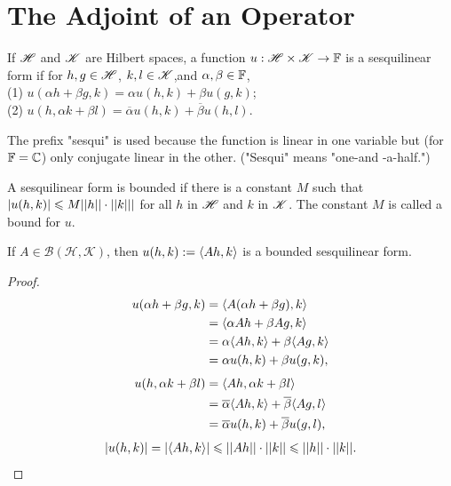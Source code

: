 \chapter{The Adjoint of an Operator}\label{chp:2_2}

\begin{definition}{}{}
    If $\mathscr{H}$ and $\mathscr{K}$ are Hilbert spaces, a function $u:\mathscr{H}\times\mathscr{K}\rightarrow \mathbb{F}$ is a sesquilinear form if for 
    $h,g\in\mathscr{H}$, $k,l\in \mathscr{K}$,and $\alpha,\beta\in\mathbb{F}$,\\
    (1) $u(\alpha h+\beta g,k)=\alpha u(h,k)+\beta u(g,k)$;\\
    (2) $u(h,\alpha k+\beta l)=\overline{\alpha}u(h,k)+\overline{\beta}u(h,l)$.
\end{definition}

The prefix "sesqui" is used because the function is linear in one variable 
but (for $\mathbb{F} = \mathbb{C}$) only conjugate linear in the other. ("Sesqui" means 
"one-and -a-half.")

A sesquilinear form is bounded if there is a constant $M$ such that 
$|u(h,k)|\leqslant M||h||\cdot ||k|||$ for all $h$ in $\mathscr{H}$ and $k$ in $\mathscr{K}$. 
The constant $M$ is called a bound for $u$.


\begin{proposition}
    If $A \in \mathcal{B}(\mathscr{H},\mathscr{K})$, 
then $u(h, k):=  \langle Ah,k\rangle$ is a bounded sesquilinear form.
\end{proposition}

\begin{proof}{}{}
    \begin{align*}
        u(\alpha h+\beta g,k) &=  \langle A(\alpha h+\beta g),k\rangle\\
                            &= \langle\alpha Ah+\beta Ag,k\rangle\\
                            &= \alpha \langle Ah,k\rangle + \beta\langle Ag,k\rangle\\
                            &= \alpha u(h,k) + \beta u(g,k),
    \end{align*}
    \begin{align*}
        u(h,\alpha k+\beta l) &=  \langle Ah,\alpha k+\beta l\rangle\\
                            &= \overline{\alpha} \langle Ah,k\rangle + 
                            \overline{\beta}\langle Ag,l\rangle\\
                            &= \overline{\alpha} u(h,k) + \overline{\beta} u(g,l),
    \end{align*}
    \begin{align*}
        |u(h,k)| = |\langle Ah,k\rangle|\leqslant ||Ah||\cdot ||k||\leqslant ||h||\cdot||k||.
    \end{align*}
\end{proof}

